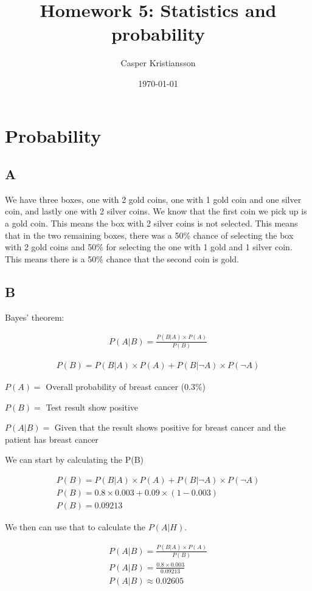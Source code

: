 \documentclass{article}
\title{Homework 5: Statistics and probability}
\author{Casper Kristiansson}
\date{\today}
\begin{document}
\maketitle

\section{Probability}
\subsection{A}
We have three boxes, one with 2 gold coins, one with 1 gold coin and one silver coin, and lastly one with 2 silver coins. We know that the first coin we pick up is a gold coin. This means the box with 2 silver coins is not selected. This means that in the two remaining boxes, there was a 50\% chance of selecting the box with 2 gold coins and 50\% for selecting the one with 1 gold and 1 silver coin. This means there is a 50\% chance that the second coin is gold.

\subsection{B}
Bayes' theorem:

\begin{align*}
P(A|B) = \frac{P(B|A) \times P(A)}{P(B)}
\end{align*}

\begin{align*}
P(B) = P(B|A) \times P(A)+P(B| \neg A) \times P(\neg A)
\end{align*}


\noindent \(P(A)=\) Overall probability of breast cancer (0.3\%)

\noindent \(P(B)=\) Test result show positive

\noindent \(P(A|B)=\) Given that the result shows positive for breast cancer and the patient has breast cancer

\noindent We can start by calculating the P(B)

\begin{align*}
P(B) = P(B|A) \times P(A)+P(B| \neg A) \times P(\neg A) \\
P(B) = 0.8 \times 0.003 + 0.09 \times (1-0.003) \\
P(B) = 0.09213
\end{align*}

\noindent We then can use that to calculate the $P(A|H)$.

\begin{align*}
P(A|B) = \frac{P(B|A) \times P(A)}{P(B)} \\
P(A|B) = \frac{0.8 \times 0.003}{0.09213} \\
P(A|B) \approx 0.02605
\end{align*}
\end{document}
